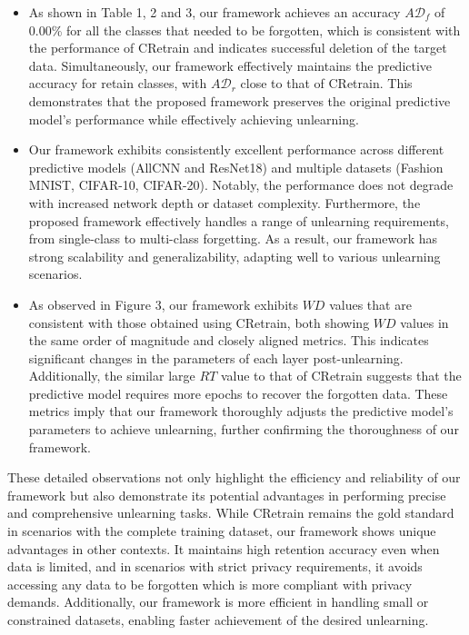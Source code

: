 \documentclass[preprint,12pt]{elsarticle}
\begin{document}
\begin{itemize}
    \item As shown in Table 1, 2 and 3, our framework achieves an accuracy $A\mathcal{D}_f$ of 0.00\% for all the classes that needed to be forgotten, which is consistent with the performance of CRetrain and indicates successful deletion of the target data. Simultaneously, our framework effectively maintains the predictive accuracy for retain classes, with $A\mathcal{D}_r$ close to that of CRetrain. This demonstrates that the proposed framework preserves the original predictive model's performance while effectively achieving unlearning.

    \item Our framework exhibits consistently excellent performance across different predictive models (AllCNN and ResNet18) and multiple datasets (Fashion MNIST, CIFAR-10, CIFAR-20). Notably, the performance does not degrade with increased network depth or dataset complexity. Furthermore, the proposed framework effectively handles a range of unlearning requirements, from single-class to multi-class forgetting. As a result, our framework has strong scalability and generalizability, adapting well to various unlearning scenarios.

    \item As observed in Figure 3, our framework exhibits $\textit{WD}$ values that are consistent with those obtained using CRetrain, both showing $\textit{WD}$ values in the same order of magnitude and closely aligned metrics. This indicates significant changes in the parameters of each layer post-unlearning. Additionally, the similar large $RT$ value to that of CRetrain suggests that the predictive model requires more epochs to recover the forgotten data. These metrics imply that our framework thoroughly adjusts the predictive model's parameters to achieve unlearning, further confirming the thoroughness of our framework.
\end{itemize}

These detailed observations not only highlight the efficiency and reliability of our framework but also demonstrate its potential advantages in performing precise and comprehensive unlearning tasks. While CRetrain remains the gold standard in scenarios with the complete training dataset, our framework shows unique advantages in other contexts. It maintains high retention accuracy even when data is limited, and in scenarios with strict privacy requirements, it avoids accessing any data to be forgotten which is more compliant with privacy demands. Additionally, our framework is more efficient in handling small or constrained datasets, enabling faster achievement of the desired unlearning.
\end{document}
